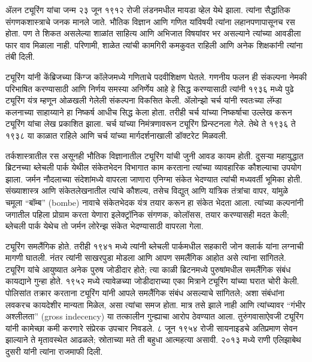 \documentclass[../../../include/open-logic-section]{subfiles}
\begin{document}


ॲलन ट्यूरिंग यांचा जन्म २३ जून १९१२ रोजी लंडनमधील मायडा व्हेल येथे झाला. त्यांना सैद्धांतिक संगणकशास्त्राचे जनक मानले जाते. भौतिक विज्ञान आणि गणित यांविषयी त्यांना लहानपणापासूनच रस होता. पण ते शिकत असलेल्या शाळांत साहित्य आणि अभिजात विषयांवर भर असल्याने त्यांच्या आवडीला फार वाव मिळाला नाही. परिणामी, शाळेत त्यांची कामगिरी कमकुवत राहिली आणि अनेक शिक्षकांनी त्यांना तंबी दिली.


ट्यूरिंग यांनी केंब्रिजच्या किंग्ज कॉलेजमध्ये गणिताचे पदवीशिक्षण घेतले. गणनीय फलन ही संकल्पना नेमकी परिभाषित करण्यासाठी आणि निर्णय समस्या अनिर्णेय आहे हे सिद्ध करण्यासाठी त्यांनी १९३६ मध्ये पुढे ट्यूरिंग यंत्र म्हणून ओळखली गेलेली संकल्पना विकसित केली. ॲलोन्झो चर्च यांनी स्वतःच्या लॅम्डा कलनाच्या साहाय्याने हा निष्कर्ष आधीच सिद्ध केला होता. तरीही चर्च यांच्या निष्कर्षाचा उल्लेख करून ट्यूरिंग यांचा लेख प्रकाशित झाला. चर्च यांच्या निमंत्रणावरून ट्यूरिंग प्रिन्स्टनला गेले. तेथे ते १९३६ ते १९३८ या काळात राहिले आणि चर्च यांच्या मार्गदर्शनाखाली डॉक्टरेट मिळवली.

तर्कशास्त्रातील रस असूनही भौतिक विज्ञानातील ट्यूरिंग यांची जुनी आवड कायम होती. दुसऱ्या महायुद्धात ब्रिटनच्या ब्लेचली पार्क येथील संकेतभेदन विभागात काम करताना त्यांच्या व्यावहारिक कौशल्याचा उपयोग झाला. जर्मन नौदलाच्या संदेशांमध्ये वापरला जाणारा एनिग्मा संकेत भेदण्यात त्यांची मध्यवर्ती भूमिका होती. संख्याशास्त्र आणि संकेतलेखनातील त्यांचे कौशल्य, तसेच विद्युत् आणि यांत्रिक तंत्रांचा वापर, यांमुळे चमूला “बॉम्ब” (bombe) नावाचे संकेतभेदक यंत्र तयार करून हा संकेत भेदता आला. त्यांच्या कल्पनांनी जगातील पहिला प्रोग्राम करता येणारा इलेक्ट्रॉनिक संगणक, कोलॉसस, तयार करण्यासही मदत केली; ब्लेचली पार्क येथेच तो जर्मन लोरेन्झ संकेत भेदण्यासाठी वापरला गेला.

ट्यूरिंग समलैंगिक होते. तरीही १९४१ मध्ये त्यांनी ब्लेचली पार्कमधील सहकारी जोन क्लार्क यांना लग्नाची मागणी घातली. नंतर त्यांनी साखरपुडा मोडला आणि आपण समलैंगिक आहोत असे त्यांना सांगितले. ट्यूरिंग यांचे आयुष्यात अनेक पुरुष जोडीदार होते; त्या काळी ब्रिटनमध्ये पुरुषांमधील समलैंगिक संबंध कायद्याने गुन्हा होते. १९५२ मध्ये त्यावेळच्या जोडीदाराच्या एका मित्राने ट्यूरिंग यांच्या घरात चोरी केली. पोलिसांत तक्रार करताना ट्यूरिंग यांनी आपले समलैंगिक संबंध असल्याचे सांगितले; अशा संबंधांना लवकरच कायदेशीर मान्यता मिळेल, असा त्यांचा समज होता. मात्र तसे झाले नाही आणि त्यांच्यावर “गंभीर अश्लीलता” (gross indecency) या तत्कालीन गुन्ह्याचा आरोप ठेवण्यात आला. तुरुंगवासाऐवजी ट्यूरिंग यांनी कामेच्छा कमी करणारे संप्रेरक उपचार निवडले. ८ जून १९५४ रोजी सायनाइडचे अतिप्रमाण सेवन झाल्याने ते मृतावस्थेत आढळले; स्रोताच्या मते ती बहुधा आत्महत्या असावी. २०१३ मध्ये राणी एलिझाबेथ दुसरी यांनी त्यांना राजमाफी दिली.
\end{document}
